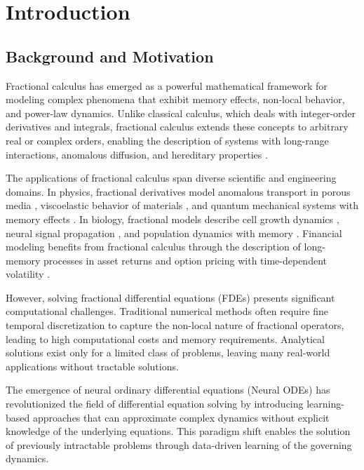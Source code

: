 \section{Introduction}

\subsection{Background and Motivation}

Fractional calculus has emerged as a powerful mathematical framework for modeling complex phenomena that exhibit memory effects, non-local behavior, and power-law dynamics. Unlike classical calculus, which deals with integer-order derivatives and integrals, fractional calculus extends these concepts to arbitrary real or complex orders, enabling the description of systems with long-range interactions, anomalous diffusion, and hereditary properties \cite{podlubny1999fractional, kilbas2006theory}.

The applications of fractional calculus span diverse scientific and engineering domains. In physics, fractional derivatives model anomalous transport in porous media \cite{metzler2000random}, viscoelastic behavior of materials \cite{mainardi2010fractional}, and quantum mechanical systems with memory effects \cite{laskin2000fractional}. In biology, fractional models describe cell growth dynamics \cite{west2003fractional}, neural signal propagation \cite{anastasio1994fractional}, and population dynamics with memory \cite{petras2011fractional}. Financial modeling benefits from fractional calculus through the description of long-memory processes in asset returns \cite{cont2001empirical} and option pricing with time-dependent volatility \cite{cartea2007fractional}.

However, solving fractional differential equations (FDEs) presents significant computational challenges. Traditional numerical methods often require fine temporal discretization to capture the non-local nature of fractional operators, leading to high computational costs and memory requirements. Analytical solutions exist only for a limited class of problems, leaving many real-world applications without tractable solutions.

The emergence of neural ordinary differential equations (Neural ODEs) \cite{chen2018neural} has revolutionized the field of differential equation solving by introducing learning-based approaches that can approximate complex dynamics without explicit knowledge of the underlying equations. This paradigm shift enables the solution of previously intractable problems through data-driven learning of the governing dynamics.

